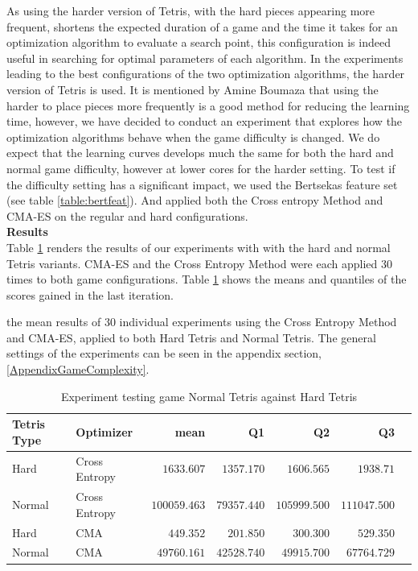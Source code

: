 As using the harder version of Tetris, with the hard pieces appearing more frequent, shortens
the expected duration of a game and  the time it takes for an optimization algorithm 
to evaluate a search point, this configuration is indeed useful in searching for optimal parameters
of each algorithm. In the experiments leading to the best configurations of the two 
optimization algorithms, the harder version of Tetris is used. It is mentioned
by Amine Boumaza that using the harder to place pieces more frequently is a good method
for reducing the learning time, however, we have decided to conduct an experiment that explores
how the optimization algorithms behave when the game difficulty is changed.
We do expect that the learning curves develops much the same 
for both the hard and normal game difficulty, however
at lower cores for the harder setting.
To test if the difficulty setting has a significant impact, we used the Bertsekas
feature set (see table \ref{table:bertfeat}). And applied both the Cross entropy 
Method and CMA-ES on the regular and hard configurations.\\

\textbf{Results}\\
Table \ref{table:difficultyRes} renders the results of our experiments 
with with the hard and normal Tetris variants. CMA-ES and the Cross Entropy Method 
were each applied 30 times to both game configurations. Table \ref{table:difficultyRes}
shows the means and quantiles of the scores gained in the last iteration.

 the mean results of 30 individual experiments using 
the Cross Entropy Method and CMA-ES, applied to both Hard Tetris and Normal Tetris. 
The general settings of the experiments can be seen in the appendix section, \ref{AppendixGameComplexity}.

\begin{table}[H]
\centering
\small
\begin{tabular}{l l r r r r r}
Tetris Type & Optimizer & mean & Q1 & Q2 & Q3\\
\hline
Hard & Cross Entropy & $1633.607$ & $1357.170$ & $1606.565$ & $1938.71$\\
Normal & Cross Entropy & $100059.463$ & $79357.440$ & $105999.500$ & $111047.500$\\
Hard & CMA & $449.352$ & $201.850$ & $300.300$ & $529.350$\\
Normal & CMA & $49760.161$ & $42528.740$ & $49915.700$ & $67764.729$\\
\end{tabular}
\caption{Experiment testing game Normal Tetris against Hard Tetris \label{table:difficultyRes}}
\end{table}


